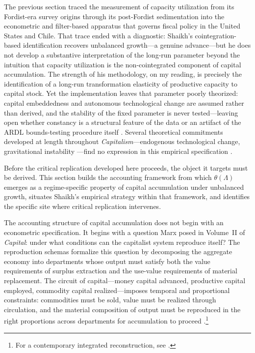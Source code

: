 \documentclass[11pt,a4paper]{article}
\begin{document}
The previous section traced the measurement of capacity utilization from its Fordist-era survey origins through its post-Fordist sedimentation into the econometric and filter-based apparatus that governs fiscal policy in the United States and Chile. That trace ended with a diagnostic: Shaikh's cointegration-based identification recovers unbalanced growth---a genuine advance---but he does not develop a substantive interpretation of the long-run parameter beyond the intuition that capacity utilization is the non-cointegrated component of capital accumulation. The strength of his methodology, on my reading, is precisely the identification of a long-run transformation elasticity of productive capacity to capital stock. Yet the implementation leaves that parameter poorly theorized: capital embeddedness and autonomous technological change are assumed rather than derived, and the stability of the fixed parameter is never tested---leaving open whether constancy is a structural feature of the data or an artifact of the ARDL bounds-testing procedure itself \citep{Pesaran2001}. Several theoretical commitments developed at length throughout \emph{Capitalism}---endogenous technological change, gravitational instability ---find no expression in this empirical specification \citep{Shaikh2016}.

Before the critical replication developed here proceeds, the object it targets must be derived. This section builds the accounting framework from which $\theta(\Lambda)$ emerges as a regime-specific property of capital accumulation under unbalanced growth, situates Shaikh's empirical strategy within that framework, and identifies the specific site where critical replication intervenes.

The accounting structure of capital accumulation does not begin with an econometric specification. It begins with a question Marx posed in Volume~II of \textit{Capital}: under what conditions can the capitalist system reproduce itself? The reproduction schemas formalize this question by decomposing the aggregate economy into departments whose output must satisfy both the value requirements of surplus extraction and the use-value requirements of material replacement. The circuit of capital---money capital advanced, productive capital employed, commodity capital realized---imposes temporal and proportional constraints: commodities must be sold, value must be realized through circulation, and the material composition of output must be reproduced in the right proportions across departments for accumulation to proceed \citep{MarxKVII}.\footnote{For a contemporary integrated reconstruction, see \citet[Ch.~4]{Basu2022}.}
\end{document}
